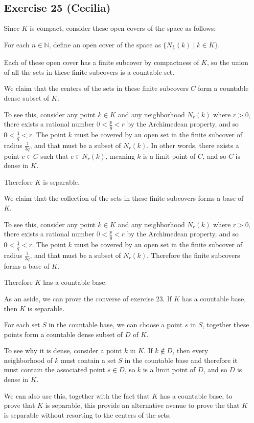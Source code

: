 \subsection*{Exercise 25 (Cecilia)}
Since $ K $ is compact, consider these open covers of the space as follows:

For each $ n \in \mathbb{N} $, define an open cover of the space as $ \{ N_{\frac{1}{n}}(k) \mid k \in K \} $.

Each of these open cover has a finite subcover by compactness of $ K $, so the union of all the sets in these finite subcovers is a countable set.

We claim that the centers of the sets in these finite subcovers $ C $ form a countable dense subset of $ K $.

To see this, consider any point $ k \in K $ and any neighborhood $ N_r(k) $ where $ r > 0 $, there exists a rational number $ 0 < \frac{p}{q} < r $ by the Archimedean property, and so $ 0 < \frac{1}{q} < r $. The point $ k $ must be covered by an open set in the finite subcover of radius $ \frac{1}{3q} $, and that must be a subset of $ N_r(k) $. In other words, there exists a point $ c \in C $ such that $ c \in N_r(k) $, meaning $ k $ is a limit point of $ C $, and so $ C $ is dense in $ K $.

Therefore $ K $ is separable.

We claim that the collection of the sets in these finite subcovers forms a base of $ K $.

To see this, consider any point $ k \in K $ and any neighborhood $ N_r(k) $ where $ r > 0 $, there exists a rational number $ 0 < \frac{p}{q} < r $ by the Archimedean property, and so $ 0 < \frac{1}{q} < r $. The point $ k $ must be covered by an open set in the finite subcover of radius $ \frac{1}{3q} $, and that must be a subset of $ N_r(k)$. Therefore the finite subcovers forms a base of $ K $.

Therefore $ K $ has a countable base.

As an aside, we can prove the converse of exercise 23. If $ K $ has a countable base, then $ K $ is separable.

For each set $ S $ in the countable base, we can choose a point $ s $ in $ S $, together these points form a countable dense subset of $ D $ of $ K $.

To see why it is dense, consider a point $ k $ in $ K $. If $ k \notin D $, then every neighborhood of $ k $ must contain a set $ S $ in the countable base and therefore it must contain the associated point $ s \in D $, so $ k $ is a limit point of $ D $, and so $ D $ is dense in $ K $.

We can also use this, together with the fact that $ K $ has a countable base, to prove that $ K $ is separable, this provide an alternative avenue to prove the that $ K $ is separable without resorting to the centers of the sets.